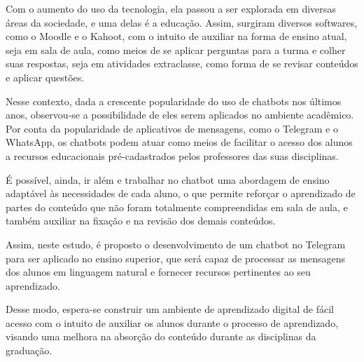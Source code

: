 Com o aumento do uso da tecnologia, ela passou a ser explorada em diversas áreas da sociedade, e uma delas é a educação. Assim, surgiram diversos softwares, como o Moodle e o Kahoot, com o intuito de auxiliar na forma de ensino atual, seja em sala de aula, como meios de se aplicar perguntas para a turma e colher suas respostas, seja em atividades extraclasse, como forma de se revisar conteúdos e aplicar questões.

Nesse contexto, dada a crescente popularidade do uso de chatbots nos últimos anos, observou-se a possibilidade de eles serem aplicados no ambiente acadêmico. Por conta da popularidade de aplicativos de mensagens, como o Telegram e o WhatsApp, os chatbots podem atuar como meios de facilitar o acesso dos alunos a recursos educacionais pré-cadastrados pelos professores das suas disciplinas.

É possível, ainda, ir além e trabalhar no chatbot uma abordagem de ensino adaptável às necessidades de cada aluno, o que permite reforçar o aprendizado de partes do conteúdo que não foram totalmente compreendidas em sala de aula, e também auxiliar na fixação e na revisão dos demais conteúdos.

Assim, neste estudo, é proposto o desenvolvimento de um chatbot no Telegram para ser aplicado no ensino superior, que será capaz de processar as mensagens dos alunos em linguagem natural e fornecer recursos pertinentes ao seu aprendizado.

Desse modo, espera-se construir um ambiente de aprendizado digital de fácil acesso com o intuito de auxiliar os alunos durante o processo de aprendizado, visando uma melhora na absorção do conteúdo durante as disciplinas da graduação.

